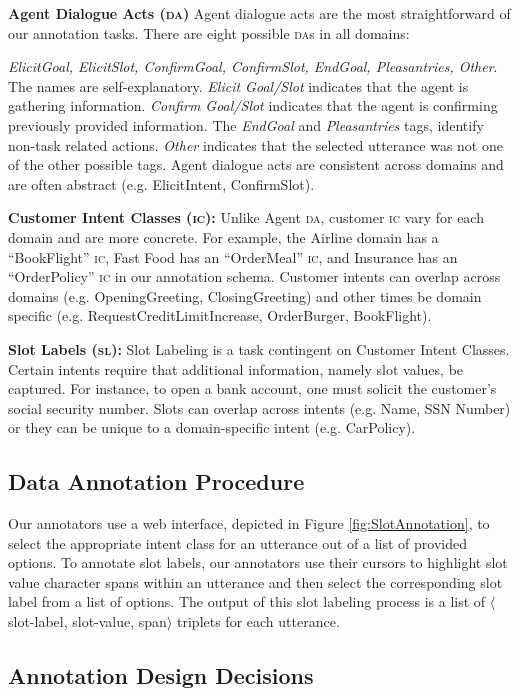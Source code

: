 \textbf{Agent Dialogue Acts (\textsc{da})} Agent dialogue acts are the 
most straightforward of our annotation tasks. There are eight possible \textsc{da}s in all domains: 
{\textit{ElicitGoal, ElicitSlot, ConfirmGoal, ConfirmSlot, EndGoal, Pleasantries, Other}. The names are self-explanatory.  \textit{Elicit Goal/Slot} indicates that the agent is gathering information. \textit{Confirm Goal/Slot} indicates that the agent is confirming previously provided information.  The \textit{EndGoal} and \textit{Pleasantries} tags, identify non-task related actions. \textit{Other} indicates that the selected utterance was not one of the other possible tags. Agent dialogue acts are consistent across domains and are often abstract (e.g. ElicitIntent, ConfirmSlot).
	
	\textbf{Customer Intent Classes (\textsc{ic}):}
	Unlike Agent \textsc{da}, customer \textsc{ic} vary for each domain and are more concrete.  For example, the Airline domain has a ``BookFlight'' \textsc{ic}, Fast Food has an ``OrderMeal'' \textsc{ic}, and Insurance has an ``OrderPolicy'' \textsc{ic} in our annotation schema.  Customer intents can overlap across domains (e.g. OpeningGreeting, ClosingGreeting) and other times be domain specific (e.g. RequestCreditLimitIncrease, OrderBurger, BookFlight). 
	
	
	{\textbf{Slot Labels (\textsc{sl}):}
	Slot Labeling is a task contingent on Customer Intent Classes.  Certain intents require that additional information, namely slot values, be captured. For instance, to open a bank account, one must solicit the customer's social security number.  Slots can overlap across intents (e.g. Name, SSN Number) or they can be unique to a domain-specific intent (e.g. CarPolicy). 
	
	
	\subsection{Data Annotation Procedure}
	Our annotators use a web interface, depicted in Figure \ref{fig:SlotAnnotation}, to select the appropriate intent class for an utterance out of a list of provided options. To annotate slot labels, our annotators use their cursors to highlight slot value character spans within an utterance and then select the corresponding slot label from a list of options. The output of this slot labeling process is a list of $\langle$slot-label, slot-value, span$\rangle$ triplets for each utterance.  
	\subsection{Annotation Design Decisions}
	\label{sec:motivation}
	
}}
